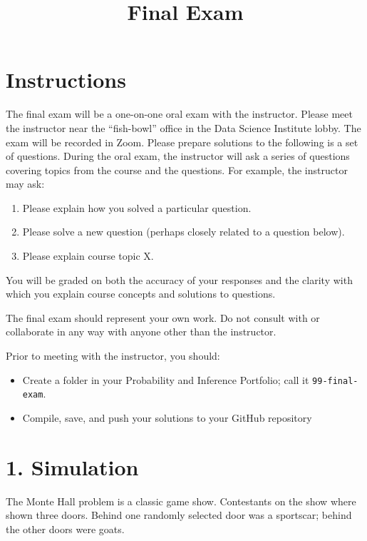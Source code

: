 \documentclass[
]{article}
\title{Final Exam}
\author{}
\date{\vspace{-2.5em}}
\providecommand{\tightlist}{%
  \setlength{\itemsep}{0pt}\setlength{\parskip}{0pt}}
\begin{document}
\maketitle

\hypertarget{instructions}{%
\section{Instructions}\label{instructions}}

The final exam will be a one-on-one oral exam with the instructor.
Please meet the instructor near the ``fish-bowl'' office in the Data
Science Institute lobby. The exam will be recorded in Zoom. Please
prepare solutions to the following is a set of questions. During the
oral exam, the instructor will ask a series of questions covering topics
from the course and the questions. For example, the instructor may ask:

\begin{enumerate}
\def\labelenumi{\arabic{enumi}.}
\tightlist
\item
  Please explain how you solved a particular question.
\item
  Please solve a new question (perhaps closely related to a question
  below).
\item
  Please explain course topic X.
\end{enumerate}

You will be graded on both the accuracy of your responses and the
clarity with which you explain course concepts and solutions to
questions.

The final exam should represent your own work. Do not consult with or
collaborate in any way with anyone other than the instructor.

Prior to meeting with the instructor, you should:

\begin{itemize}
\tightlist
\item
  Create a folder in your Probability and Inference Portfolio; call it
  \texttt{99-final-exam}.
\item
  Compile, save, and push your solutions to your GitHub repository
\end{itemize}

\hypertarget{simulation}{%
\section{1. Simulation}\label{simulation}}

The Monte Hall problem is a classic game show. Contestants on the show
where shown three doors. Behind one randomly selected door was a
sportscar; behind the other doors were goats.
\end{document}
